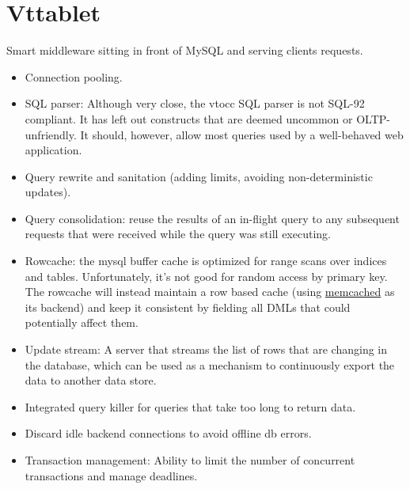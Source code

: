 \section{Vttablet}\label{Vttablet}

Smart middleware sitting in front of MySQL and serving clients
requests.

\begin{itemize}
\item Connection pooling.
\item SQL parser: Although very close, the vtocc SQL parser is not SQL-92
compliant. It has left out constructs that are deemed uncommon or
OLTP-unfriendly. It should, however, allow most queries used by a
well-behaved web application.
\item Query rewrite and sanitation (adding limits, avoiding non-deterministic updates).
\item Query consolidation: reuse the results of an in-flight query to any
subsequent requests that were received while the query was still
executing.
\item Rowcache: the mysql buffer cache is optimized for range scans over
indices and tables. Unfortunately, it’s not good for random access
by primary key. The rowcache will instead maintain a row based cache
(using \href{http://memcached.org/}{memcached} as its backend) and keep it
consistent by fielding all DMLs that could potentially affect them.
\item Update stream: A server that streams the list of rows that are changing
in the database, which can be used as a mechanism to continuously export
the data to another data store.
\item Integrated query killer for queries that take too long to return
data.
\item Discard idle backend connections to avoid offline db errors.
\item Transaction management: Ability to limit the number of concurrent
transactions and manage deadlines.
\end{itemize}
